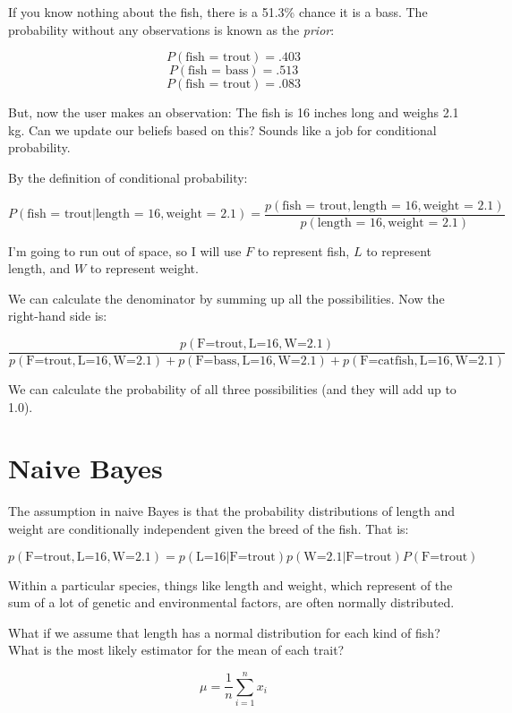 If you know nothing about the fish,  there is a 51.3\% chance it is a bass.   The probability without any observations is known as the \textit{prior}:

$$P(\text{fish = trout}) = .403$$
$$P(\text{fish = bass}) = .513$$
$$P(\text{fish = trout}) = .083$$

But, now the user makes an observation: The fish is 16 inches long and weighs 2.1 kg.  Can we update our beliefs based on this? Sounds like a job for conditional probability.

By the definition of conditional probability:

$$P(\text{fish = trout} | \text{length = 16}, \text{weight = 2.1}) = \frac{p(\text{fish = trout} , \text{length = 16}, \text{weight = 2.1}) }{p( \text{length = 16}, \text{weight = 2.1}) }$$

I'm going to run out of space,  so I will use $F$ to represent fish, $L$ to represent length, and $W$ to represent weight.

We can calculate the denominator by summing up all the possibilities.   Now the right-hand side is:

$$\frac{p(\text{F=trout} , \text{L=16}, \text{W=2.1}) }{p(\text{F=trout} , \text{L=16}, \text{W=2.1})  + p(\text{F=bass} , \text{L=16}, \text{W=2.1})  + p(\text{F=catfish} , \text{L=16}, \text{W=2.1})  }$$

We can calculate the probability of all three possibilities (and they will add up to 1.0).

\section{Naive Bayes}

The assumption in naive Bayes is that the probability distributions of length and weight are conditionally independent given the breed of the fish.   That is:

$$p(\text{F=trout} , \text{L=16}, \text{W=2.1}) = p( \text{L=16} | \text{F=trout})  p( \text{W=2.1} | \text{F=trout})P(\text{F=trout})$$

Within a particular species, things like length and weight, which represent of the sum of a lot of genetic and environmental factors,  are often normally distributed.

What if we assume that length has a normal distribution for each kind of fish?  What is the most likely estimator for the mean of each trait?  

$$\mu = \frac{1}{n} \sum_{i=1}^{n} x_i$$

